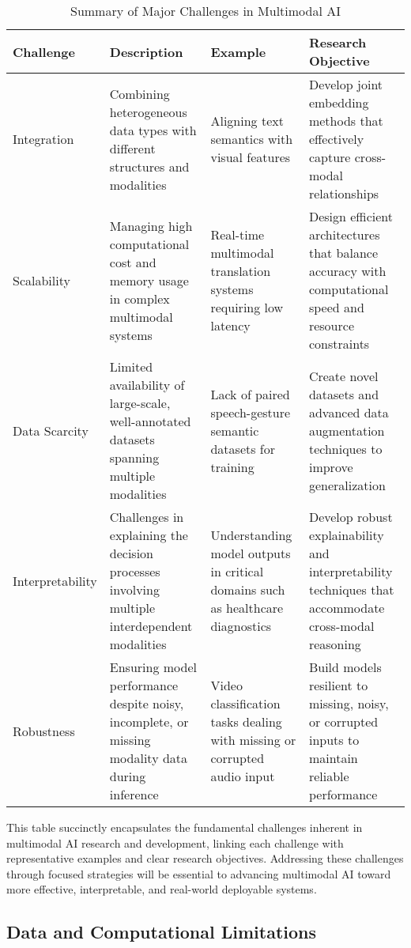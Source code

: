 \documentclass[sigconf]{acmart}
\begin{document}
\begin{table*}[htbp]
\centering
\caption{Summary of Major Challenges in Multimodal AI}
\label{tab:challenges}
\begin{adjustbox}{max width=\textwidth}
\begin{tabular}{@{}llll@{}}
\toprule
Challenge & Description & Example & Research Objective \\ \midrule
Integration & Combining heterogeneous data types with different structures and modalities & Aligning text semantics with visual features & Develop joint embedding methods that effectively capture cross-modal relationships \\ 
Scalability & Managing high computational cost and memory usage in complex multimodal systems & Real-time multimodal translation systems requiring low latency & Design efficient architectures that balance accuracy with computational speed and resource constraints \\
Data Scarcity & Limited availability of large-scale, well-annotated datasets spanning multiple modalities & Lack of paired speech-gesture semantic datasets for training & Create novel datasets and advanced data augmentation techniques to improve generalization \\
Interpretability & Challenges in explaining the decision processes involving multiple interdependent modalities & Understanding model outputs in critical domains such as healthcare diagnostics & Develop robust explainability and interpretability techniques that accommodate cross-modal reasoning \\
Robustness & Ensuring model performance despite noisy, incomplete, or missing modality data during inference & Video classification tasks dealing with missing or corrupted audio input & Build models resilient to missing, noisy, or corrupted inputs to maintain reliable performance \\ \bottomrule
\end{tabular}
\end{adjustbox}
\end{table*}

This table succinctly encapsulates the fundamental challenges inherent in multimodal AI research and development, linking each challenge with representative examples and clear research objectives. Addressing these challenges through focused strategies will be essential to advancing multimodal AI toward more effective, interpretable, and real-world deployable systems.

\subsection{Data and Computational Limitations}
\end{document}
